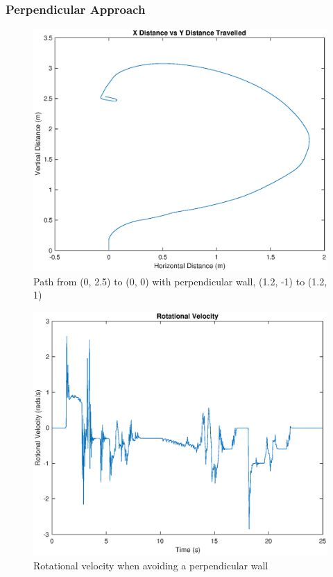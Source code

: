 \documentclass[11pt]{article}
\newcommand{\graphScale}{0.5}
\begin{document}
\subsubsection{Perpendicular Approach}
\begin{figure}[H]
    \centering
\includegraphics[scale=\graphScale]{./figures/PerpApproach.eps}
\caption{Path from (0, 2.5) to (0, 0) with perpendicular wall, (1.2, -1) to (1.2, 1)}
\end{figure}

\begin{figure}[H]
    \centering
\includegraphics[scale=\graphScale]{./figures/PerpRotVel.eps}
\caption{Rotational velocity when avoiding a perpendicular wall}
\end{figure}
\end{document}
